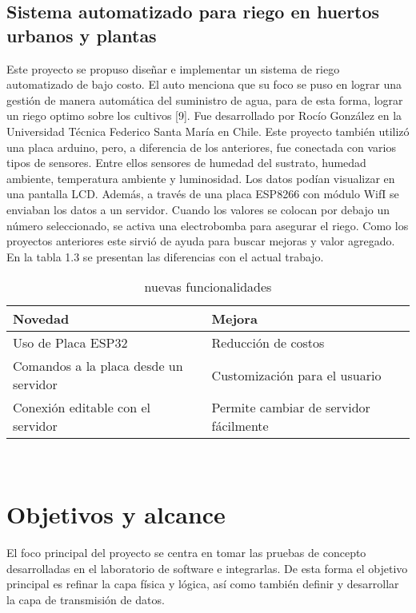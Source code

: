 \subsection{Sistema automatizado para riego en huertos urbanos y plantas}
Este proyecto se propuso diseñar e implementar un sistema de riego automatizado de bajo costo. El auto menciona que su foco se puso en lograr una gestión de manera automática del suministro de agua, para de esta forma, lograr un riego optimo sobre los cultivos [9]. Fue desarrollado por Rocío González en la Universidad Técnica Federico Santa María en Chile.
Este proyecto también utilizó una placa arduino, pero, a diferencia de los anteriores, fue conectada con varios tipos de sensores. Entre ellos sensores de humedad del sustrato, humedad ambiente, temperatura ambiente y luminosidad. Los datos podían visualizar en una pantalla LCD. Además, a través de una placa ESP8266 con módulo WifI se enviaban los datos a un servidor. Cuando los valores se colocan por debajo un número seleccionado, se activa una electrobomba para asegurar el riego. Como los proyectos anteriores este sirvió de ayuda para buscar mejoras y valor agregado. En la tabla 1.3 se presentan las diferencias con el actual trabajo.\\

\begin{table}[h]
	\centering
	\caption[comparativa 3 de nuevas funcionalidades]{nuevas funcionalidades}
	\begin{tabular}{l l}    
		\toprule
		\textbf{Novedad} & \textbf{Mejora}\\	
		\midrule
		Uso de Placa ESP32           & Reducción de costos	\\		
		Comandos a la placa desde un servidor          & Customización para el usuario\\	
		Conexión editable con el servidor & Permite cambiar de servidor fácilmente\\	
		\bottomrule
		\hline
	\end{tabular}
	\label{tab:peces}\\
\end{table}


\section{Objetivos y alcance}
El foco principal del proyecto se centra en tomar las pruebas de concepto desarrolladas en el laboratorio de software e integrarlas. De esta forma el objetivo principal es refinar la capa física y lógica, así como también definir y desarrollar la capa de transmisión de datos.

